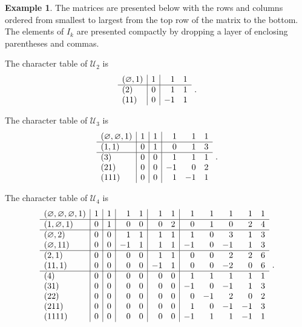 \documentclass[10pt]{amsart}
\theoremstyle{definition}
\newtheorem{example}[theorem]{Example}
\theoremstyle{remark}
\newcommand{\epart}{\text{\footnotesize$\varnothing$}}
\begin{document}
\begin{example} \label{Ex:charactertable}
\label{ex:UBP2chartable}
The matrices are presented below with the rows and columns ordered from
smallest to largest from the top row of the matrix to the bottom.  The elements of
$I_k$ are presented compactly by dropping a layer of enclosing parentheses and commas.

The character table of $\mathcal{U}_2$ is
$$
\begin{array}{l|r|rr}
(\epart,1) & 1 & 1 & 1\\
\hline
(2) & 0 & 1 & 1\\
(11) & 0 & -1 & 1
\end{array}~.
$$

\label{ex:UBP3chartable}
The character table
of $\mathcal{U}_3$ is
$$
\begin{array}{l|r|r|rrr}
(\epart, \epart, 1) & 1 & 1 & 1 & 1 & 1\\
\hline
(1, 1) & 0 & 1 & 0 & 1 & 3\\
\hline
(3) & 0 & 0 & 1 & 1 & 1\\
(21) & 0 & 0 & -1 & 0 & 2\\
(111) & 0 & 0 & 1 & -1 & 1
\end{array}~.
$$

\label{ex:UBP4chartable}
The character table
of $\mathcal{U}_4$ is
$$
\begin{array}{l|r|r|rr|rr|rrrrr}
(\epart, \epart, \epart, 1) & 1 & 1 & 1 & 1 & 1 & 1 & 1 & 1 & 1 & 1 & 1\\
\hline
(1, \epart, 1) &0 & 1 & 0 & 0 & 0 & 2 & 0 & 1 & 0 & 2 & 4\\
\hline
(\epart, 2) &0 & 0 & 1 & 1 & 1 & 1 & 1 & 0 & 3 & 1 & 3\\
(\epart, 11) &0 & 0 & -1 & 1 & 1 & 1 & -1 & 0 & -1 & 1 & 3\\
\hline
(2, 1) &0 & 0 & 0 & 0 & 1 & 1 & 0 & 0 & 2 & 2 & 6\\
(11, 1) &0 & 0 & 0 & 0 & -1 & 1 & 0 & 0 & -2 & 0 & 6\\
\hline
(4) &0 & 0 & 0 & 0 & 0 & 0 & 1 & 1 & 1 & 1 & 1\\
(31) &0 & 0 & 0 & 0 & 0 & 0 & -1 & 0 & -1 & 1 & 3\\
(22) &0 & 0 & 0 & 0 & 0 & 0 & 0 & -1 & 2 & 0 & 2\\
(211) &0 & 0 & 0 & 0 & 0 & 0 & 1 & 0 & -1 & -1 & 3\\
(1111) &0 & 0 & 0 & 0 & 0 & 0 & -1 & 1 & 1 & -1 & 1
\end{array}~.
$$
\end{example}
\end{document}
